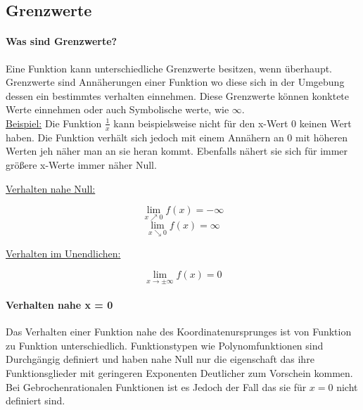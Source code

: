 \documentclass{article}
\begin{document}
	\subsection{Grenzwerte}
		\paragraph{Was sind Grenzwerte?} \label{Definitionsbereich}
			Eine Funktion kann unterschiedliche Grenzwerte besitzen, wenn überhaupt. Grenzwerte sind Annäherungen einer Funktion wo diese sich in der Umgebung dessen ein bestimmtes verhalten einnehmen. Diese Grenzwerte können konktete Werte einnehmen oder auch Symbolische werte, wie $\infty$. \\
			\underline{Beispiel:} Die Funktion $ \frac {1} {x}$ kann beispielsweise nicht für den x-Wert $0$ keinen Wert haben. Die Funktion verhält sich jedoch mit einem Annähern an $0$ mit höheren Werten jeh näher man an sie heran kommt. Ebenfalls nähert sie sich für immer größere x-Werte immer näher Null.
			
			\begin{multicols}{2}
			
		
				\underline{Verhalten nahe Null:}
				
				\[\lim\limits_{x \nearrow 0} f(x) = - \infty\]
				\[\lim\limits_{x \searrow 0} f(x) =  \infty\]
				
				\underline{Verhalten im Unendlichen:}
				
				\[\lim\limits_{x \rightarrow \pm \infty} f(x) = 0\]
			
			\end{multicols}
				
		\paragraph{Verhalten nahe x = 0}\label{Verhalten nahe Null}
			Das Verhalten einer Funktion nahe des Koordinatenursprunges ist von Funktion zu Funktion unterschiedlich. Funktionstypen wie Polynomfunktionen sind Durchgängig definiert und haben nahe Null nur die eigenschaft das ihre Funktionsglieder mit geringeren Exponenten Deutlicher zum Vorschein kommen. Bei Gebrochenrationalen Funktionen ist es Jedoch der Fall das sie für $x = 0$ nicht definiert sind.\\
			
\end{document}
